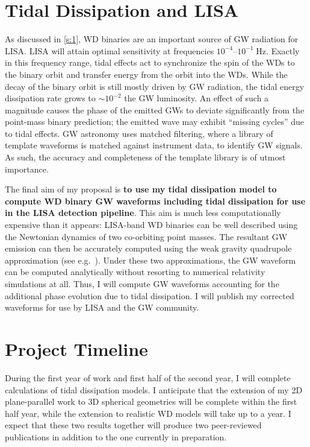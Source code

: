 \documentclass[12pt,
        usenames, %
        dvipsnames %
    ]{article}
\begin{document}
\section{Tidal Dissipation and LISA}\label{s:4}

As discussed in \autoref{s:1}, WD binaries are an important source of GW
radiation for LISA\@. LISA will attain optimal sensitivity at frequencies
$10^{-4}$--$10^{-1}\;\mathrm{Hz}$\cite{LISA_band}. Exactly in this frequency
range, tidal effects act to synchronize the spin of the WDs to the binary orbit
and transfer energy from the orbit into the WDs. While the decay of the binary
orbit is still mostly driven by GW radiation, the tidal energy dissipation rate
grows to $\sim10^{-2}$ the GW luminosity\cite{fullerII,fullerIV}. An effect of
such a magnitude causes the phase of the emitted GWs to deviate significantly
from the point-mass binary prediction; the emitted wave may exhibit ``missing
cycles'' due to tidal effects\cite{fullerII}. GW astronomy uses matched
filtering, where a library of template waveforms is matched against instrument
data, to identify GW signals. As such, the accuracy and completeness of the
template library is of utmost importance.

The final aim of my proposal is \textbf{to use my tidal dissipation model to
compute WD binary GW waveforms including tidal dissipation for use in the LISA
detection pipeline}. This aim is much less computationally expensive than it
appears: LISA-band WD binaries can be well described using the Newtonian
dynamics of two co-orbiting point masses\cite{DWD_pointmass}. The resultant GW
emission can then be accurately computed using the weak gravity quadrupole
approximation (see e.g.~\cite{peters,lsst_wd}). Under these two approximations,
the GW waveform can be computed analytically without resorting to numerical
relativity simulations at all. Thus, I will compute GW waveforms accounting for
the additional phase evolution due to tidal dissipation. I will publish my
corrected waveforms for use by LISA and the GW community.

\section{Project Timeline}

During the first year of work and first half of the second year, I will complete
calculations of tidal dissipation models. I anticipate that the extension of my
2D plane-parallel work to 3D spherical geometries will be complete within the
first half year, while the extension to realistic WD models will take up to a
year. I expect that these two results together will produce two peer-reviewed
publications in addition to the one currently in preparation.
\end{document}
